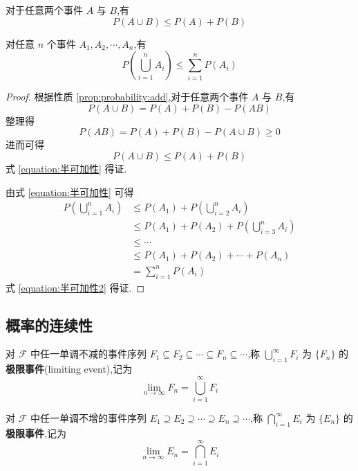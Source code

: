 \begin{corollary}[][半可加性]
    \indent 对于任意两个事件 $A$ 与 $B$,有
    \begin{equation} \label{equation:半可加性}
        P(A \cup B) \leqslant P(A) + P(B)
    \end{equation}

    对任意 $n$ 个事件 $A_1,A_2,\cdots,A_n$,有
    \begin{equation} \label{equation:半可加性2}
        P \left(\bigcup_{i=1}^n A_i \right) \leqslant \sum_{i=1}^n P(A_i)
    \end{equation}
\end{corollary}

\begin{proof}
    根据性质 \ref{prop:probability:add},对于任意两个事件 $A$ 与 $B$,有
    $$
    P(A \cup B) = P(A) + P(B) - P(AB)
    $$
    整理得
    $$
    P(AB) = P(A) + P(B) - P(A \cup B) \geqslant 0
    $$
    进而可得
    $$
    P(A \cup B) \leqslant P(A) + P(B)
    $$
    式 \eqref{equation:半可加性} 得证.

    由式 \eqref{equation:半可加性} 可得
    $$
    \begin{aligned}
        P \left(\bigcup_{i=1}^n A_i \right) & \leqslant P(A_1) + P \left(\bigcup_{i=2}^n A_i \right) \\
        & \leqslant P(A_1) + P(A_2) + P \left(\bigcup_{i=3}^n A_i \right) \\
        & \leqslant \cdots \\
        & \leqslant P(A_1) + P(A_2) + \cdots + P(A_n) \\
        &= \sum_{i=1}^n P(A_i)
    \end{aligned}
    $$
    式 \eqref{equation:半可加性2} 得证.
\end{proof}

\subsection{概率的连续性}

\begin{definition}
    \indent 对 $\mathcal{F}$ 中任一单调不减的事件序列 $F_1 \subseteq F_2 \subseteq \cdots \subseteq F_n \subseteq \cdots$,称 $\displaystyle\bigcup_{i=1}^{\infty} F_i$ 为 $\{F_n\}$ 的\textbf{极限事件}(limiting event),记为
    $$
    \lim_{n \to \infty} F_n = \bigcup_{i=1}^{\infty} F_i
    $$

    对 $\mathcal{F}$ 中任一单调不增的事件序列 $E_1 \supseteq E_2 \supseteq \cdots \supseteq E_n \supseteq \cdots$,称 $\displaystyle\bigcap_{i=1}^{\infty} E_i$ 为 $\{E_n\}$ 的\textbf{极限事件},记为
    $$
    \lim_{n \to \infty} E_n = \bigcap_{i=1}^{\infty} E_i
    $$
\end{definition}

